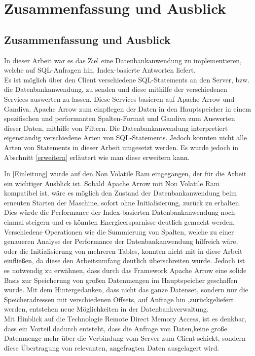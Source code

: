 \chapter{Zusammenfassung und Ausblick}
\label{Zusammenfassung}

\section{Zusammenfassung und Ausblick}

In dieser Arbeit war es das Ziel eine Datenbankanwendung zu implementieren, welche auf SQL-Anfragen hin, Index-basierte Antworten liefert. \\
Es ist möglich über den Client verschiedene SQL-Statements an den Server, bzw. die Datenbankanwendung, zu senden und diese mithilfe der verschiedenen Services auswerten zu lassen. 
Diese Services basieren auf Apache Arrow und Gandiva. Apache Arrow zum einpflegen der Daten in den Hauptspeicher in einem spezifischen und performanten Spalten-Format und Gandiva zum Auswerten dieser Daten, mithilfe von Filtern. 
Die Datenbankanwendung interpretiert eigenständig verschiedene Arten von SQL-Statements. Jedoch konnten nicht alle Arten von Statements in dieser Arbeit umgesetzt werden. 
Es wurde jedoch in Abschnitt \ref{erweitern} erläutert wie man diese erweitern kann.

In \ref{Einleitung} wurde auf den Non Volatile Ram eingegangen, der für die Arbeit ein wichtiger Ausblick ist. 
Sobald Apache Arrow mit Non Volatile Ram kompatibel ist, wäre es möglich den Zustand der Datenbankanwendung beim erneuten Starten der Maschine, sofort ohne Initialisierung, zurück zu erhalten. Dies würde die Performance der Index-basierten Datenbankanwendung noch einmal steigern und es könnten Energieersparnisse deutlich gemacht werden.
\\
Verschiedene Operationen wie die Summierung von Spalten, welche zu einer genaueren Analyse der Performance der Datenbankanwendung hilfreich wäre, oder die Initialisierung von mehreren Tables, konnten nicht mit in diese Arbeit einfließen, da diese den Arbeitsumfang deutlich überschreiten würde. Jedoch ist es notwendig zu erwähnen, dass durch das Framework Apache Arrow eine solide Basis zur Speicherung von großen Datenmengen im Hauptspeicher geschaffen wurde.
Mit dem Hintergedanken, dass nicht das ganze Datenset, sondern nur die Speicheradressen mit verschiedenen Offsets, auf Anfrage hin ,zurückgeliefert werden, entstehen neue Möglichkeiten in der Datenbankverwaltung.
\\ 
Mit Hinblick auf die Technologie Remote Direct Memory Access, ist es denkbar, dass ein Vorteil dadurch entsteht, dass die Anfrage von Daten,keine große Datenmenge mehr über die Verbindung vom Server zum Client schickt, sondern diese Übertragung von relevanten, angefragten Daten ausgelagert wird.

